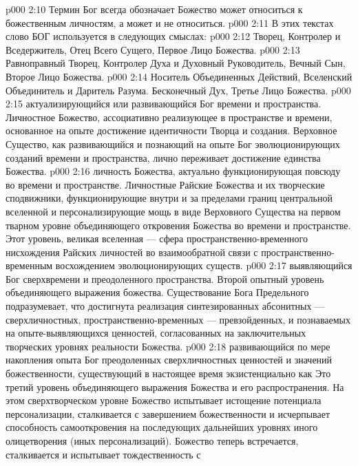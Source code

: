 \vs p000 2:10 \pc Термин Бог всегда обозначает  Божество может относиться к божественным личностям, а может и не относиться.
\vs p000 2:11 \pc В этих текстах слово БОГ используется в следующих смыслах:
\vs p000 2:12 \bibnobreakspace {} Творец, Контролер и Вседержитель, Отец Всего Сущего, Первое Лицо Божества.
\vs p000 2:13 \bibnobreakspace {} Равноправный Творец, Контролер Духа и Духовный Руководитель, Вечный Сын, Второе Лицо Божества.
\vs p000 2:14 \bibnobreakspace {} Носитель Объединенных Действий, Вселенский Объединитель и Даритель Разума. Бесконечный Дух, Третье Лицо Божества.
\vs p000 2:15 \bibnobreakspace {} актуализирующийся или развивающийся Бог времени и пространства. Личностное Божество, ассоциативно реализующее в пространстве и времени, основанное на опыте достижение идентичности Творца и создания. Верховное Существо, как развивающийся и познающий на опыте Бог эволюционирующих созданий времени и пространства, лично переживает достижение единства Божества.
\vs p000 2:16 \bibnobreakspace {} личность Божества, актуально функционирующая повсюду во времени и пространстве. Личностные Райские Божества и их творческие сподвижники, функционирующие внутри и за пределами границ центральной вселенной и персонализирующие мощь в виде Верховного Существа на первом тварном уровне объединяющего откровения Божества во времени и пространстве. Этот уровень, великая вселенная --- сфера пространственно\hyp{}временного нисхождения Райских личностей во взаимообратной связи с пространственно\hyp{}временным восхождением эволюционирующих существ.
\vs p000 2:17 \bibnobreakspace {} выявляющийся Бог сверхвремени и преодоленного пространства. Второй опытный уровень объединяющего выражения божества. Существование Бога Предельного подразумевает, что достигнута реализация синтезированных абсонитных --- сверхличностных, пространственно\hyp{}временных --- превзойденных, и познаваемых на опыте\hyp{}выявляющихся ценностей, согласованных на заключительных творческих уровнях реальности Божества.
\vs p000 2:18 \bibnobreakspace {} развивающийся по мере накопления опыта Бог преодоленных сверхличностных ценностей и значений божественности, существующий в настоящее время экзистенциально как  Это третий уровень объединяющего выражения Божества и его распространения. На этом сверхтворческом уровне Божество испытывает истощение потенциала персонализации, сталкивается с завершением божественности и исчерпывает способность самооткровения на последующих дальнейших уровнях иного олицетворения (иных персонализаций). Божество теперь встречается, сталкивается и испытывает тождественность с 
